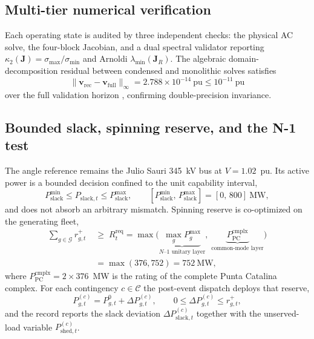 \subsection{Multi-tier numerical verification}
\label{sub:trinity}

Each operating state is audited by three independent checks: the physical AC solve, the four-block Jacobian, and a dual spectral validator reporting $\kappa_2(\mathbf{J}) = \sigma_{\max} / \sigma_{\min}$ and Arnoldi $\lambda_{\min}(\mathbf{J}_R)$. The algebraic domain-decomposition residual between condensed and monolithic solves satisfies
\begin{equation}
\|\mathbf{v}_{\mathrm{rec}} - \mathbf{v}_{\mathrm{full}}\|_\infty = 2.788 \times 10^{-14}\ \mathrm{pu} \le 10^{-11}\ \mathrm{pu}
\label{eq:trinity}
\end{equation}
over the full validation horizon \cite{vancutsem1998}, confirming double-precision invariance.

\subsection{Bounded slack, spinning reserve, and the N-1 test}
\label{sub:n1}

The angle reference remains the Julio Sauri 345~kV bus at $V=1.02$~pu. Its active power is a bounded decision confined to the unit capability interval,
\begin{equation}
P_{\mathrm{slack}}^{\min} \le P_{\mathrm{slack},t} \le P_{\mathrm{slack}}^{\max}, \qquad [P_{\mathrm{slack}}^{\min},\, P_{\mathrm{slack}}^{\max}] = [0,\, 800]~\mathrm{MW},
\label{eq:slackbox}
\end{equation}
and does not absorb an arbitrary mismatch. Spinning reserve is co-optimized on the generating fleet,
\begin{equation}
\begin{aligned}
\sum_{g \in \mathcal{G}} r_{g,t}^{+} \;&\ge\; R_t^{\mathrm{req}}
= \max\bigl(\underbrace{\max_{g} P_g^{\max}}_{\text{$N$--$1$ unitary layer}},\;
\underbrace{P_{\mathrm{PC}}^{\mathrm{cmplx}}}_{\text{common-mode layer}}\bigr)\\
&= \max(376, 752) = 752~\mathrm{MW},
\end{aligned}
\label{eq:reserve}
\end{equation}
where $P_{\mathrm{PC}}^{\mathrm{cmplx}} = 2 \times 376$~MW is the rating of the complete Punta Catalina complex. For each contingency $c \in \mathcal{C}$ the post-event dispatch deploys that reserve,
\begin{equation}
P_{g,t}^{(c)} = P_{g,t}^{0} + \Delta P_{g,t}^{(c)}, \qquad 0 \le \Delta P_{g,t}^{(c)} \le r_{g,t}^{+},
\label{eq:deploy}
\end{equation}
and the record reports the slack deviation $\Delta P_{\mathrm{slack},t}^{(c)}$ together with the unserved-load variable $P_{\mathrm{shed},t}^{(c)}$.

